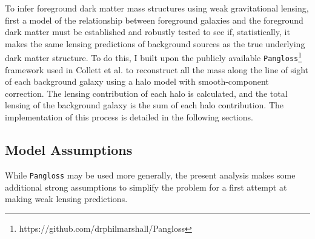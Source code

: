 \documentclass[%
 reprint,
 amsmath,amssymb,
 aps,nofootinbib
]{revtex4-1}
\begin{document}

To infer foreground dark matter mass structures using weak gravitational lensing, first a model of the relationship between foreground galaxies and the foreground dark matter must be established and robustly tested to see if, statistically, it makes the same lensing predictions of background sources as the true underlying dark matter structure. To do this, I built upon the publicly available \texttt{Pangloss}\footnote{\label{note1}https://github.com/drphilmarshall/Pangloss} framework used in Collett et al. \cite{collett_marshall} to reconstruct all the
mass along the line of sight of each background galaxy using a halo model with smooth-component correction. The lensing contribution of each halo is calculated, and the total lensing of the background galaxy is the sum of each halo contribution. The implementation of this process is detailed in the following sections.


\subsection{Model Assumptions} \label{assumptions}
While \texttt{Pangloss} may be used more generally, the present analysis makes some additional strong assumptions to simplify the problem for a first attempt at making weak lensing predictions.
\end{document}
